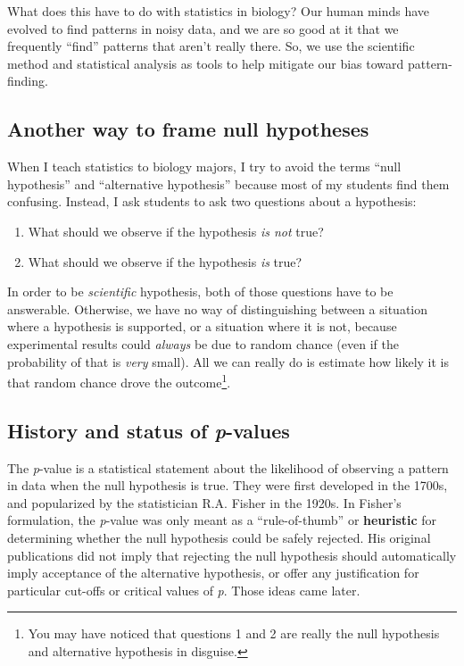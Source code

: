 \documentclass[
  13,
  letterpaper,
]{report}
\begin{document}
What does this have to do with statistics in biology? Our human minds
have evolved to find patterns in noisy data, and we are so good at it
that we frequently ``find'' patterns that aren't really there. So, we
use the scientific method and statistical analysis as tools to help
mitigate our bias toward pattern-finding.

\subsection{Another way to frame null
hypotheses}\label{sec-01-pvals-alt}

When I teach statistics to biology majors, I try to avoid the terms
``null hypothesis'' and ``alternative hypothesis'' because most of my
students find them confusing. Instead, I ask students to ask two
questions about a hypothesis:

\begin{enumerate}
\def\labelenumi{\arabic{enumi}.}
\item
  What should we observe if the hypothesis \emph{is not} true?
\item
  What should we observe if the hypothesis \emph{is} true?
\end{enumerate}

In order to be \emph{scientific} hypothesis, both of those questions
have to be answerable. Otherwise, we have no way of distinguishing
between a situation where a hypothesis is supported, or a situation
where it is not, because experimental results could \emph{always} be due
to random chance (even if the probability of that is \emph{very} small).
All we can really do is estimate how likely it is that random chance
drove the outcome\footnote{You may have noticed that questions 1 and 2
  are really the null hypothesis and alternative hypothesis in disguise.}.

\subsection{\texorpdfstring{History and status of
\emph{p}-values}{History and status of p-values}}\label{sec-01-pvals-hist}

The \emph{p}-value is a statistical statement about the likelihood of
observing a pattern in data when the null hypothesis is true. They were
first developed in the 1700s, and popularized by the statistician R.A.
Fisher in the 1920s. In Fisher's formulation, the \emph{p}-value was
only meant as a ``rule-of-thumb'' or \textbf{heuristic} for determining
whether the null hypothesis could be safely rejected. His original
publications did not imply that rejecting the null hypothesis should
automatically imply acceptance of the alternative hypothesis, or offer
any justification for particular cut-offs or critical values of
\emph{p}. Those ideas came later.
\end{document}
